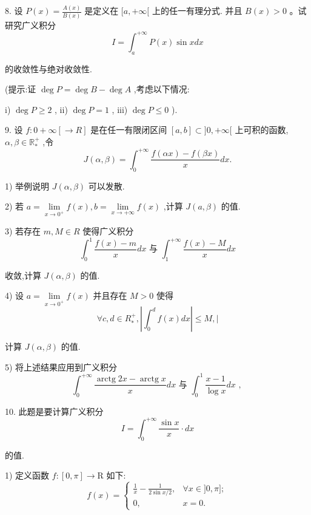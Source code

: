 8. 设 $P\left( x\right)  = \frac{A\left( x\right) }{B\left( x\right) }$ 是定义在 $\lbrack a, + \infty \lbrack$ 上的任一有理分式. 并且 $B\left( x\right)  > 0$ 。试研究广义积分
$$I = {\int }_{a}^{+\infty }P\left( x\right) \sin {xdx}$$

的收敛性与绝对收敛性.

(提示:证 $\deg P = \deg B - \deg A$ ,考虑以下情况:

i) $\deg P \geq  2$ , ii) $\deg P = 1$ , iii) $\deg P \leq  0$ ).

9. 设 $f : 0 + \infty \left\lbrack  { \rightarrow  R}\right\rbrack$ 是在任一有限闭区间 $\left\lbrack  {a,b}\right\rbrack   \subset  \rbrack 0, + \infty \lbrack$ 上可积的函数, $\alpha ,\beta  \in  {\mathbb{R}}_{ * }^{ + }$ ,令
$$J\left( {\alpha ,\beta }\right)  = {\int }_{0}^{+\infty }\frac{f\left( {\alpha x}\right)  - f\left( {\beta x}\right) }{x}{dx}.$$

1) 举例说明 $J\left( {\alpha ,\beta }\right)$ 可以发散.

2) 若 $a = \mathop{\lim }\limits_{{x \rightarrow  {0}^{ + }}}f\left( x\right) ,b = \mathop{\lim }\limits_{{x \rightarrow   + \infty }}f\left( x\right)$ ,计算 $J\left( {a,\beta }\right)$ 的值.

3) 若存在 $m,M \in  R$ 使得广义积分
$${\int }_{0}^{1}\frac{f\left( x\right)  - m}{x}{dx}\text{ 与 }{\int }_{1}^{+\infty }\frac{f\left( x\right)  - M}{x}{dx}$$

收敛,计算 $J\left( {\alpha ,\beta }\right)$ 的值.

4) 设 $a = \mathop{\lim }\limits_{{x \rightarrow  {0}^{ + }}}f\left( x\right)$ 并且存在 $M > 0$ 使得
$$\forall c,d \in  {R}_{ * }^{ + },\left| {{\int }_{0}^{d}f\left( x\right) {dx}}\right|  \leq  M, \mid$$

计算 $J\left( {\alpha ,\beta }\right)$ 的值.

5) 将上述结果应用到广义积分
$${\int }_{0}^{+\infty }\frac{\operatorname{arctg}{2x} - \operatorname{arctg}x}{x}{dx}\text{ 与 }{\int }_{0}^{1}\frac{x - 1}{\log x}{dx}\text{ , }$$

10. 此题是要计算广义积分
$$I = {\int }_{0}^{+\infty }\frac{\sin x}{x} \cdot  {dx}$$

的值.

1) 定义函数 $f : \left\lbrack  {0,\pi }\right\rbrack   \rightarrow  \mathrm{R}$ 如下:
$$f\left( x\right)  = \left\{  \begin{matrix} \frac{1}{x} - \frac{1}{2\sin x/2}, & \forall x \in  \rbrack 0,\pi \rbrack ; \\  0, & x = 0. \end{matrix}\right.$$

